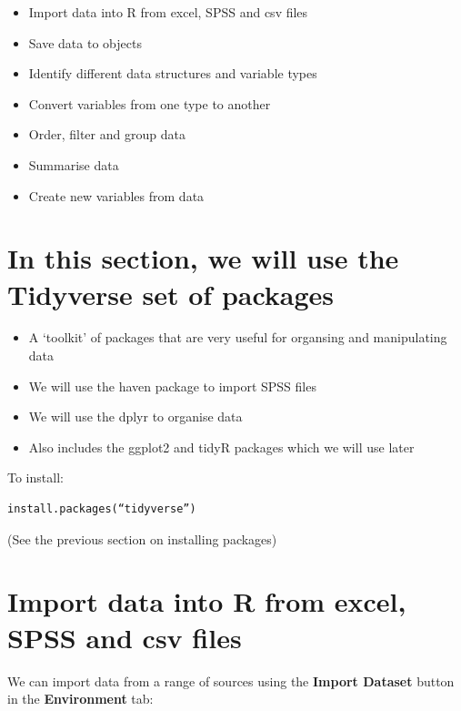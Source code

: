 \documentclass[
]{book}
\providecommand{\tightlist}{%
  \setlength{\itemsep}{0pt}\setlength{\parskip}{0pt}}
\begin{document}
\begin{itemize}
\tightlist
\item
  Import data into R from excel, SPSS and csv files
\item
  Save data to objects
\item
  Identify different data structures and variable types
\item
  Convert variables from one type to another
\item
  Order, filter and group data
\item
  Summarise data
\item
  Create new variables from data
\end{itemize}

\hypertarget{in-this-section-we-will-use-the-tidyverse-set-of-packages}{%
\section{In this section, we will use the Tidyverse set of packages}\label{in-this-section-we-will-use-the-tidyverse-set-of-packages}}

\begin{itemize}
\tightlist
\item
  A `toolkit' of packages that are very useful for organsing and manipulating data
\item
  We will use the haven package to import SPSS files
\item
  We will use the dplyr to organise data
\item
  Also includes the ggplot2 and tidyR packages which we will use later
\end{itemize}

To install:

\begin{verbatim}
install.packages(“tidyverse”)
\end{verbatim}

(See the previous section on installing packages)

\hypertarget{import-data-into-r-from-excel-spss-and-csv-files}{%
\section{Import data into R from excel, SPSS and csv files}\label{import-data-into-r-from-excel-spss-and-csv-files}}

We can import data from a range of sources using the \textbf{Import Dataset} button in the \textbf{Environment} tab:
\end{document}
